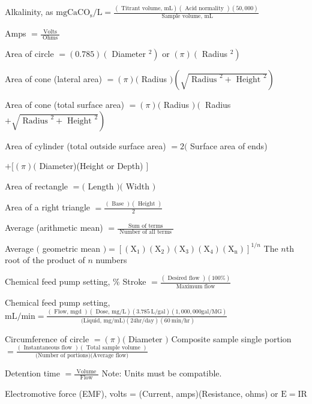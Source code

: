\documentclass[10pt]{article}
\begin{document}
Alkalinity, as $\mathrm{mg} \mathrm{CaCO}_{\mathrm{s}} / \mathrm{L}=\frac{(\text { Titrant volume, } \mathrm{mL})(\text { Acid normality })(50,000)}{\text { Sample volume, } \mathrm{mL}}$

Amps $=\frac{\text { Volts }}{\text { Ohms }}$

Area of circle $=(0.785)\left(\right.$ Diameter $\left.^{2}\right)$ or $(\pi)\left(\right.$ Radius $\left.^{2}\right)$

Area of cone (lateral area) $=(\pi)($ Radius $)\left(\sqrt{\text { Radius }^{2}+\text { Height }^{2}}\right)$

Area of cone (total surface area) $=(\pi)($ Radius $)\left(\right.$ Radius $\left.+\sqrt{\text { Radius }^{2}+\text { Height }^{2}}\right)$

Area of cylinder (total outside surface area) $=2($ Surface area of ends)

$+[(\pi)($ Diameter)(Height or Depth) $]$

Area of rectangle $=($ Length $)($ Width $)$

Area of a right triangle $=\frac{(\text { Base })(\text { Height })}{2}$

Average (arithmetic mean) $=\frac{\text { Sum of terms }}{\text { Number of all terms }}$

Average $($ geometric mean $)=\left[\left(\mathrm{X}_{1}\right)\left(\mathrm{X}_{2}\right)\left(\mathrm{X}_{3}\right)\left(\mathrm{X}_{4}\right)\left(\mathrm{X}_{\mathrm{n}}\right)\right]^{1 / n}$ The $n$th root of the product of $n$ numbers

Chemical feed pump setting, \% Stroke $=\frac{(\text { Desired flow })(100 \%)}{\text { Maximum flow }}$

Chemical feed pump setting, $\mathrm{mL} / \mathrm{min}=\frac{(\text { Flow, mgd })(\text { Dose, } \mathrm{mg} / \mathrm{L})(3.785 \mathrm{~L} / \mathrm{gal})(1,000,000 \mathrm{gal} / \mathrm{MG})}{\text { (Liquid, } \mathrm{mg} / \mathrm{mL})(24 \mathrm{hr} / \mathrm{day})(60 \mathrm{~min} / \mathrm{hr})}$

Circumference of circle $=(\pi)($ Diameter $)$ Composite sample single portion $=\frac{(\text { Instantaneous flow })(\text { Total sample volume })}{\text { (Number of portions)(Average flow) }}$

Detention time $=\frac{\text { Volume }}{\text { Flow }}$ Note: Units must be compatible.

Electromotive force (EMF), volts = (Current, amps)(Resistance, ohms) or $\mathrm{E}=\mathrm{IR}$
\end{document}
